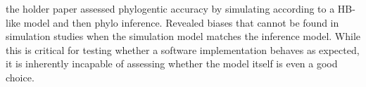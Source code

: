 \documentclass{pnastwo}
\begin{document}
\begin{article}
the holder paper assessed phylogentic accuracy by simulating according to a HB-like model and then phylo inference. Revealed biases that cannot be found in simulation studies when the simulation model matches the inference model. While this is critical for testing whether a software implementation behaves as expected, it is inherently incapable of assessing whether the model itself is even a good choice.




\end{article}
\end{document}
